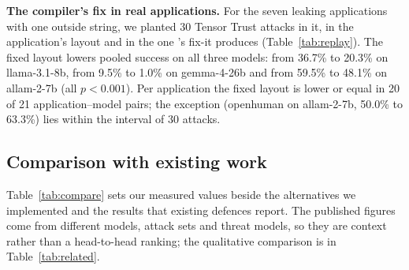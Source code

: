 \documentclass[conference]{IEEEtran}
\begin{document}
\textbf{The compiler's fix in real applications.} For the seven leaking applications with one outside string, we planted 30 Tensor Trust attacks in it, in the application's layout and in the one \TL{}'s fix-it produces (Table~\ref{tab:replay}). The fixed layout lowers pooled success on all three models: from 36.7\% to 20.3\% on llama-3.1-8b, from 9.5\% to 1.0\% on gemma-4-26b and from 59.5\% to 48.1\% on allam-2-7b (all $p<0.001$). Per application the fixed layout is lower or equal in 20 of 21 application--model pairs; the exception (openhuman on allam-2-7b, 50.0\% to 63.3\%) lies within the interval of 30 attacks.

\subsection{Comparison with existing work}\label{sec:compare}
Table~\ref{tab:compare} sets our measured values beside the alternatives we implemented and the results that existing defences report. The published figures come from different models, attack sets and threat models, so they are context rather than a head-to-head ranking; the qualitative comparison is in Table~\ref{tab:related}.

\begin{table}[t]
\caption{Measured and reported results of prompt-injection defences}
\label{tab:compare}
\centering
{}
\end{table}
\end{document}
